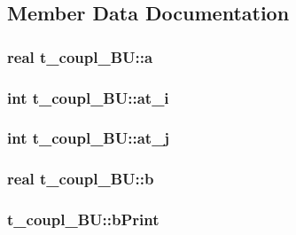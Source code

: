 \subsection{\-Member \-Data \-Documentation}
\hypertarget{structt__coupl__BU_a8e20720adcca4de40bc050730f6e4a41}{
\subsubsection[{a}]{\setlength{\rightskip}{0pt plus 5cm}real {\bf t\-\_\-coupl\-\_\-\-B\-U\-::a}}}\label{structt__coupl__BU_a8e20720adcca4de40bc050730f6e4a41}
\hypertarget{structt__coupl__BU_a630243f67d4f24939785477616dbab01}{
\subsubsection[{at\-\_\-i}]{\setlength{\rightskip}{0pt plus 5cm}int {\bf t\-\_\-coupl\-\_\-\-B\-U\-::at\-\_\-i}}}\label{structt__coupl__BU_a630243f67d4f24939785477616dbab01}
\hypertarget{structt__coupl__BU_a7f6c6aab93f082bb48a4c94ffa558703}{
\subsubsection[{at\-\_\-j}]{\setlength{\rightskip}{0pt plus 5cm}int {\bf t\-\_\-coupl\-\_\-\-B\-U\-::at\-\_\-j}}}\label{structt__coupl__BU_a7f6c6aab93f082bb48a4c94ffa558703}
\hypertarget{structt__coupl__BU_ae7d5a86a3a3045955a71282c505d4b49}{
\subsubsection[{b}]{\setlength{\rightskip}{0pt plus 5cm}real {\bf t\-\_\-coupl\-\_\-\-B\-U\-::b}}}\label{structt__coupl__BU_ae7d5a86a3a3045955a71282c505d4b49}
\hypertarget{structt__coupl__BU_a3026345b2b418027e4660feb664adecc}{
\subsubsection[{b\-Print}]{ {\bf t\-\_\-coupl\-\_\-\-B\-U\-::b\-Print}}}\label{structt__coupl__BU_a3026345b2b418027e4660feb664adecc}
